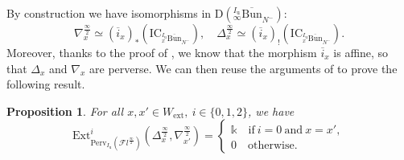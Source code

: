 \documentclass[11pt]{amsart}
\theoremstyle{plain}
\newtheorem{prop}[thm]{Proposition}
\theoremstyle{remark}
\numberwithin{equation}{section}
\begin{document}
By construction we have isomorphisms in $\mathrm{D}({^{I_\mathrm{u}}_\infty\overline{\mathrm{Bun}}}_{N^-})$:
$$\nabla_x^{\frac{\infty}{2}}\simeq (\overline{i}_x)_{*}(\mathrm{IC}_{{^{I_{\mathrm{u}}}_x\overline{\mathrm{Bun}}}_{N^-}}),\quad \Delta_x^{\frac{\infty}{2}}\simeq (\overline{i}_x)_{!}(\mathrm{IC}_{{^{I_{\mathrm{u}}}_x\overline{\mathrm{Bun}}}_{N^-}}).$$ 
Moreover, thanks to the proof of \cite[Corollary 4.4.5]{ABBGM}, we know that the morphism $\overline{i}_x$ is affine,  so that $\Delta_x$ and $\nabla_x$ are perverse. We can then reuse the arguments of \cite[Corollary 4.4.7]{ABBGM} to prove the following result.
	\begin{prop}\label{prop ext}
		For all $x,x'\in W_{\mathrm{ext}},~i\in\{0,1,2\}$, we have
		$$\mathrm{Ext}^i_{\mathrm{Perv}_{I_{\mathrm{u}}}(\mathcal{F}l^{\frac{\infty}{2}})}(\Delta_x^{\frac{\infty}{2}},\nabla_{x'}^{\frac{\infty}{2}})=\begin{cases} \mathbb{k}\quad\text{if}~i=0~\text{and}~x=x',\\0\quad\text{otherwise}.
		\end{cases}$$
	\end{prop}
\end{document}
